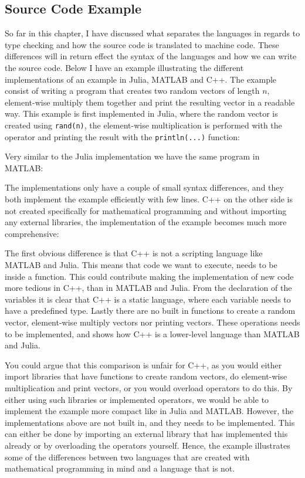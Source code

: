 \subsection{Source Code Example}
So far in this chapter, I have discussed what separates the languages in regards to type checking and how the source code is translated to machine code. These differences will in return effect the syntax of the languages and how we can write the source code. Below I have an example illustrating the different implementations of an example in Julia, MATLAB and C++. The example consist of writing a program that creates two random vectors of length $n$, element-wise multiply them together and print the resulting vector in a readable way. This example is first implemented in Julia, where the random vector is created using \texttt{rand(n)}, the element-wise multiplication is performed with the operator and printing the result with the \texttt{println(...)} function:

Very similar to the Julia implementation we have the same program in MATLAB:

The implementations only have a couple of small syntax differences, and they both implement the example efficiently with few lines. C++ on the other side is not created specifically for mathematical programming and without importing any external libraries, the implementation of the example becomes much more comprehensive:

The first obvious difference is that C++ is not a scripting language like MATLAB and Julia. This means that code we want to execute, needs to be inside a function. This could contribute making the implementation of new code more tedious in C++, than in MATLAB and Julia. From the declaration of the variables it is clear that C++ is a static language, where each variable needs to have a predefined type. Lastly there are no built in functions to create a random vector, element-wise multiply vectors nor printing vectors. These operations needs to be implemented, and shows how C++ is a lower-level language than MATLAB and Julia.

You could argue that this comparison is unfair for C++, as you would either import libraries that have functions to create random vectors, do element-wise multiplication and print vectors, or you would overload operators to do this. By either using such libraries or implemented operators, we would be able to implement the example more compact like in Julia and MATLAB. However, the implementations above are not built in, and they needs to be implemented. This can either be done by importing an external library that has implemented this already or by overloading the operators yourself. Hence, the example illustrates some of the differences between two languages that are created with mathematical programming in mind and a language that is not.

